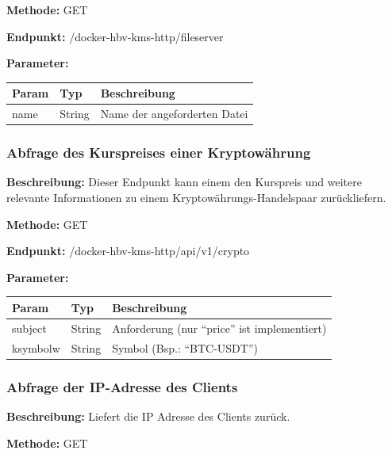 \textbf{Methode:} GET

\textbf{Endpunkt:} /docker-hbv-kms-http/fileserver

\textbf{Parameter:}
\begin{table}[H]
    \label{table:/docker-hbv-kms-http/fileserver}
    \setlength{\tabcolsep}{3pt}
    \begin{tabular}{p{100pt}p{80pt}p{200pt}}
        \toprule
        Param & Typ    & Beschreibung                 \\
        \midrule
        name  & String & Name der angeforderten Datei \\
        \bottomrule
    \end{tabular}
\end{table}
\dotfill


\subsubsection{Abfrage des Kurspreises einer Kryptowährung}
\label{sec:api-crypto}
\textbf{Beschreibung:} Dieser Endpunkt kann einem den Kurspreis und weitere relevante Informationen zu einem
Kryptowährungs-Handelspaar zurückliefern.

\textbf{Methode:} GET

\textbf{Endpunkt:} /docker-hbv-kms-http/api/v1/crypto

\textbf{Parameter:}
\begin{table}[H]
    \label{table:/docker-hbv-kms-http/api/v1/crypto}
    \setlength{\tabcolsep}{3pt}
    \begin{tabular}{p{100pt}p{80pt}p{200pt}}
        \toprule
        Param    & Typ    & Beschreibung                                  \\
        \midrule
        subject  & String & Anforderung (nur ``price'' ist implementiert) \\
        ksymbolw & String & Symbol (Bsp.: ``BTC-USDT'')                   \\
        \bottomrule
    \end{tabular}
\end{table}
\dotfill

\subsubsection{Abfrage der IP-Adresse des Clients}
\label{sec:api-client-ip}
\textbf{Beschreibung:} Liefert die IP Adresse des Clients zurück.

\textbf{Methode:} GET

